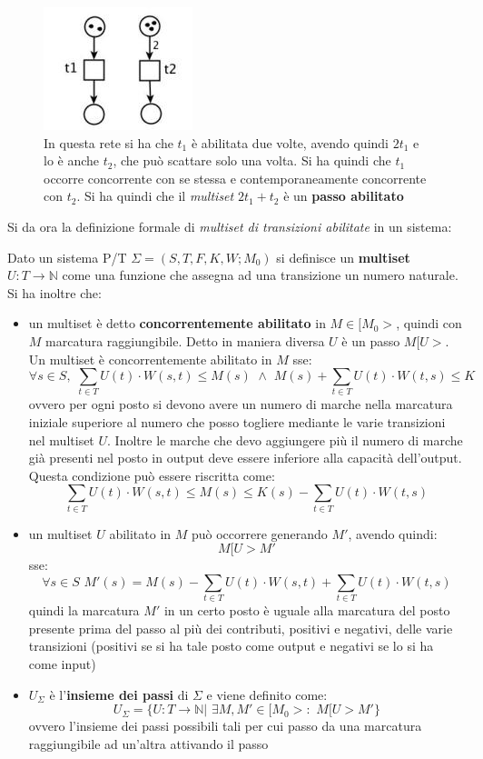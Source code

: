 \documentclass[a4paper,12pt, oneside]{book}
\begin{document}
\begin{esempio}
\begin{figure}[H]
  \end{figure}
  \begin{figure}[H]
    \centering
    \includegraphics[scale = 0.5]{img/pt27.jpg}
    \caption{In questa rete si ha che $t_1$ è abilitata due volte, avendo
      quindi $2t_1$ e lo è anche $t_2$, che può scattare solo una volta. Si ha
      quindi che $t_1$ occorre concorrente con se stessa e contemporaneamente
      concorrente con $t_2$. Si ha quindi che il \emph{multiset} $2t_1+t_2$ è un
      \textbf{passo abilitato}} 
  \end{figure}
\end{esempio}
Si da ora la definizione formale di \textit{multiset di transizioni abilitate}
in un sistema:
\begin{definizione}
  Dato un sistema P/T $\Sigma=(S, T , F , K , W;M_0)$ si definisce un
  \textbf{multiset} $U:T\to\mathbb{N}$ come una funzione che assegna ad una
  transizione un numero naturale. Si ha inoltre che:
  \begin{itemize}
    \item un multiset è detto \textbf{concorrentemente abilitato} in
    $M\in[M_0>$, quindi con $M$ marcatura raggiungibile. Detto in maniera
    diversa $U$ è un passo $M[U>$. Un multiset è concorrentemente abilitato in
    $M$ sse:
    \[\forall s\in S,\,\,\sum_{t\in T}U(t)\cdot W(s,t)\leq M(s)\,\,\wedge\,\,
      M(s)+\sum_{t\in T}U(t)\cdot W(t,s)\leq K\]
    ovvero per ogni posto si devono avere un numero di marche nella marcatura
    iniziale superiore al numero che posso togliere mediante le varie
    transizioni nel multiset $U$. Inoltre le marche che devo aggiungere più il
    numero di marche già presenti nel posto in output deve essere inferiore alla
    capacità dell'output.\\
    Questa condizione può essere riscritta come:
    \[\sum_{t\in T}U(t)\cdot W(s,t)\leq M(s)\leq K(s)-\sum_{t\in T}U(t)\cdot
      W(t,s)\]
    \item un multiset $U$ abilitato in $M$ può occorrere generando $M'$, avendo
    quindi:
    \[M[U>M'\]
    sse:
    \[\forall s\in S\,\,M'(s)=M(s)-\sum_{t\in T}U(t)\cdot W(s,t)+\sum_{t\in
        T}U(t)\cdot W(t,s)\]
    quindi la marcatura $M'$ in un certo posto è uguale alla marcatura del posto
    presente prima del passo al più dei contributi, positivi e negativi, delle
    varie transizioni (positivi se si ha tale posto come output e negativi se lo
    si ha come input)
    \item $U_\Sigma$ è l'\textbf{insieme dei passi} di $\Sigma$ e viene definito
    come:
    \[U_\Sigma=\{U:T\to \mathbb{N}|\,\,\exists M,M'\in [M_0>:\,\,M[U>M'\}\]
    ovvero l'insieme dei passi possibili tali per cui passo da una marcatura
    raggiungibile ad un'altra attivando il passo
  \end{itemize}
\end{definizione}
\end{document}
